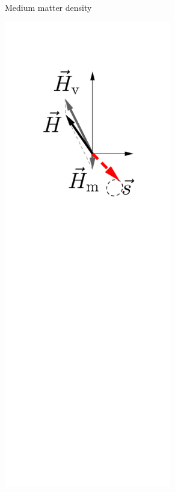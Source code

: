\begin{figure}[htbp]
\begin{subfigure}[t]{0.3\textwidth}
		\caption{Medium matter density}\label{chap:basics-sec:flavor-isospin-pic-fig:msw-adiabatic-medium-density}
	\end{subfigure}%
	\begin{subfigure}[t]{0.3\textwidth}
		\centering
    \vspace*{-3.93in}
		\includegraphics[width=0.8\textwidth]{chapters/assets/matter/matter-effect-adiabatic-3}

\end{subfigure}
\end{figure}
